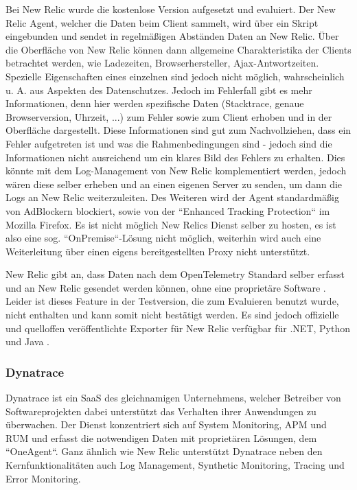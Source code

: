 
Bei New Relic wurde die kostenlose Version aufgesetzt und evaluiert. Der New Relic Agent, welcher die Daten beim Client sammelt, wird über ein Skript eingebunden und sendet in regelmäßigen Abständen Daten an New Relic. Über die Oberfläche von New Relic können dann allgemeine Charakteristika der Clients betrachtet werden, wie Ladezeiten, Browserhersteller, Ajax-Antwortzeiten. Spezielle Eigenschaften eines einzelnen sind jedoch nicht möglich, wahrscheinlich u. A. aus Aspekten des Datenschutzes. Jedoch im Fehlerfall gibt es mehr Informationen, denn hier werden spezifische Daten (Stacktrace, genaue Browserversion, Uhrzeit, ...) zum Fehler sowie zum Client erhoben und in der Oberfläche dargestellt. Diese Informationen sind gut zum Nachvollziehen, dass ein Fehler aufgetreten ist und was die Rahmenbedingungen sind - jedoch sind die Informationen nicht ausreichend um ein klares Bild des Fehlers zu erhalten. Dies könnte mit dem Log-Management von New Relic komplementiert werden, jedoch wären diese selber erheben und an einen eigenen Server zu senden, um dann die Logs an New Relic weiterzuleiten. Des Weiteren wird der Agent standardmäßig von AdBlockern blockiert, sowie von der ``Enhanced Tracking Protection`` im Mozilla Firefox. Es ist nicht möglich New Relics Dienst selber zu hosten, es ist also eine sog. ``OnPremise``-Lösung nicht möglich, weiterhin wird auch eine Weiterleitung über einen eigens bereitgestellten Proxy nicht unterstützt.

New Relic gibt an, dass Daten nach dem OpenTelemetry Standard selber erfasst und an New Relic gesendet werden können, ohne eine proprietäre Software \cite{NewRelicAnnoundOTelBetaSupport}. Leider ist dieses Feature in der Testversion, die zum Evaluieren benutzt wurde, nicht enthalten und kann somit nicht bestätigt werden. Es sind jedoch offizielle und quelloffen veröffentlichte Exporter für New Relic verfügbar für .NET, Python und Java \cite{OpenTelemetryRegistry}.

\subsubsection{Dynatrace}

Dynatrace \cite{Dynatrace} ist ein SaaS des gleichnamigen Unternehmens, welcher Betreiber von Softwareprojekten dabei unterstützt das Verhalten ihrer Anwendungen zu überwachen. Der Dienst konzentriert sich auf System Monitoring, APM und RUM und erfasst die notwendigen Daten mit proprietären Lösungen, dem ``OneAgent``. Ganz ähnlich wie New Relic unterstützt Dynatrace neben den Kernfunktionalitäten auch Log Management, Synthetic Monitoring, Tracing und Error Monitoring.

